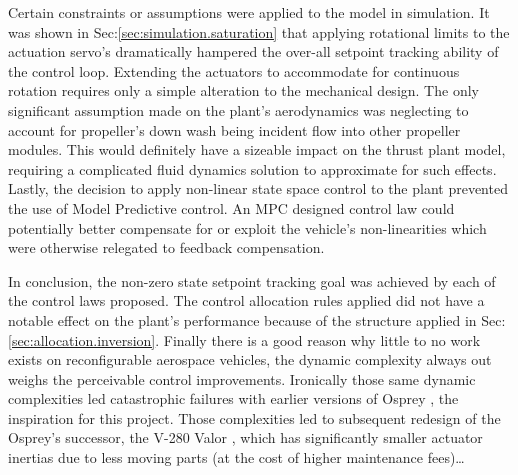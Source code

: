 \par
Certain constraints or assumptions were applied to the model in simulation. It was shown in Sec:\ref{sec:simulation.saturation} that applying rotational limits to the actuation servo's dramatically hampered the over-all setpoint tracking ability of the control loop. Extending the actuators to accommodate for continuous rotation requires only a simple alteration to the mechanical design. The only significant assumption made on the plant's aerodynamics was neglecting to account for propeller's down wash being incident flow into other propeller modules. This would definitely have a sizeable impact on the thrust plant model, requiring a complicated fluid dynamics solution to approximate for such effects. Lastly, the decision to apply non-linear state space control to the plant prevented the use of Model Predictive control. An MPC designed control law could potentially better compensate for or exploit the vehicle's non-linearities which were otherwise relegated to feedback compensation.
\par
In conclusion, the non-zero state setpoint tracking goal was achieved by each of the control laws proposed. The control allocation rules applied did not have a notable effect on the plant's performance because of the structure applied in Sec:\ref{sec:allocation.inversion}. Finally there is a good reason why little to no work exists on reconfigurable aerospace vehicles, the dynamic complexity always out weighs the perceivable control improvements. Ironically those same dynamic complexities led catastrophic failures with earlier versions of Osprey \cite{ospreywired}, the inspiration for this project. Those complexities led to subsequent redesign of the Osprey's successor, the V-280 Valor \cite{}, which has significantly smaller actuator inertias due to less moving parts (at the cost of higher maintenance fees)\ldots